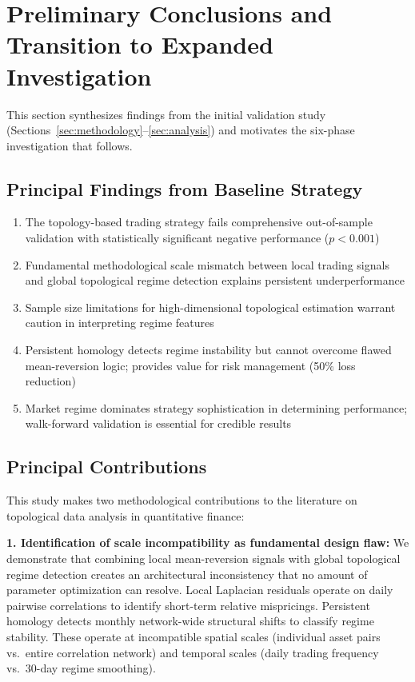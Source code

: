 \section{Preliminary Conclusions and Transition to Expanded Investigation}
\label{sec:preliminary}

This section synthesizes findings from the initial validation study (Sections~\ref{sec:methodology}--\ref{sec:analysis}) and motivates the six-phase investigation that follows.

\subsection{Principal Findings from Baseline Strategy}

\begin{enumerate}
\item The topology-based trading strategy fails comprehensive out-of-sample validation with statistically significant negative performance ($p < 0.001$)

\item Fundamental methodological scale mismatch between local trading signals and global topological regime detection explains persistent underperformance

\item Sample size limitations for high-dimensional topological estimation warrant caution in interpreting regime features

\item Persistent homology detects regime instability but cannot overcome flawed mean-reversion logic; provides value for risk management (50\% loss reduction)

\item Market regime dominates strategy sophistication in determining performance; walk-forward validation is essential for credible results
\end{enumerate}

\subsection{Principal Contributions}

This study makes two methodological contributions to the literature on topological data analysis in quantitative finance:

\textbf{1. Identification of scale incompatibility as fundamental design flaw:} We demonstrate that combining local mean-reversion signals with global topological regime detection creates an architectural inconsistency that no amount of parameter optimization can resolve. Local Laplacian residuals operate on daily pairwise correlations to identify short-term relative mispricings. Persistent homology detects monthly network-wide structural shifts to classify regime stability. These operate at incompatible spatial scales (individual asset pairs vs.\ entire correlation network) and temporal scales (daily trading frequency vs.\ 30-day regime smoothing).

